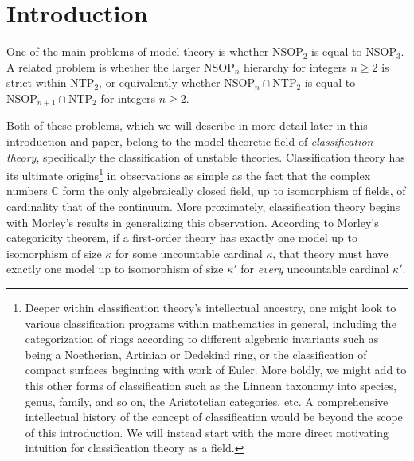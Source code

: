 \documentclass{amsart}
\theoremstyle{definition}
\theoremstyle{remark}
\numberwithin{equation}{section}
\begin{document}
\begin{abstract}
In sidebars, we give two additional applications of our techniques arising from the real-valued $\mathrm{NSOP}_{r}$ hierarchy, one to graphs definable in $\mathrm{NTP}_{2}$ theories, and another to deriving approximate implications between properties from classification theory.




\end{abstract}

\setcounter{tocdepth}{2}
\tableofcontents

\section{Introduction}

One of the main problems of model theory is whether $\mathrm{NSOP}_{2}$ is equal to $\mathrm{NSOP}_{3}$. A related problem is whether the larger $\mathrm{NSOP}_{n}$ hierarchy for integers $n \geq 2$ is strict within $\mathrm{NTP}_{2}$, or equivalently whether $\mathrm{NSOP}_{n} \cap \mathrm{NTP}_{2}$ is equal to $\mathrm{NSOP}_{n+1} \cap \mathrm{NTP}_{2}$ for integers $n \geq 2$.

Both of these problems, which we will describe in more detail later in this introduction and paper, belong to the model-theoretic field of \textit{classification theory}, specifically the classification of unstable theories. Classification theory has its ultimate origins\footnote{Deeper within classification theory's intellectual ancestry, one might look to various classification programs within mathematics in general, including the categorization of rings according to different algebraic invariants such as being a Noetherian, Artinian or Dedekind ring, or the classification of compact surfaces beginning with work of Euler. More boldly, we might add to this other forms of classification such as the Linnean taxonomy into species, genus, family, and so on, the Aristotelian categories, etc. A comprehensive intellectual history of the concept of classification would be beyond the scope of this introduction. We will instead start with the more direct motivating intuition for classification theory as a field.} in observations as simple as the fact that the complex numbers $\mathbb{C}$ form the only algebraically closed field, up to isomorphism of fields, of cardinality that of the continuum. More proximately, classification theory begins with Morley's results in \cite{M65} generalizing this observation. According to Morley's categoricity theorem, if a first-order theory has exactly one model up to isomorphism of size $\kappa$ for some uncountable cardinal $\kappa$, that theory must have exactly one model up to isomorphism of size $\kappa'$ for \textit{every} uncountable cardinal $\kappa'$.
\end{document}
